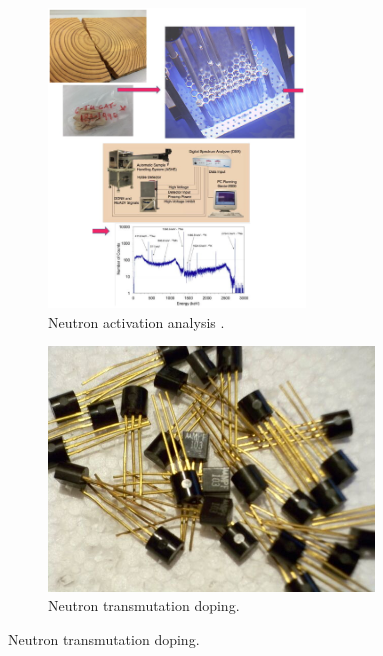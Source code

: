 \begin{figure}[!htbp] %
  \centering
  \begin{subfigure}[b]{0.45\textwidth}
    \centering
    \includegraphics[width=0.75\textwidth]{figures/neutron-activation}
    \caption{Neutron activation analysis \cite{neutron-activation}.}
  \end{subfigure}
  \hfill
  \begin{subfigure}[b]{0.53\textwidth}
    \centering
    \includegraphics[width=0.95\textwidth]{figures/neutron-transmutation}
    \caption{Neutron transmutation doping.}

\end{subfigure}
\end{figure}

